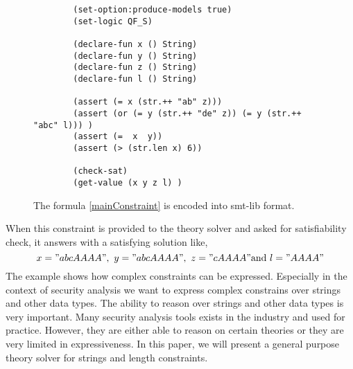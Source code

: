 	\begin{figure}[width=4cm]
		\scriptsize
		\centering
		\begin{lstlisting}
		(set-option:produce-models true)
		(set-logic QF_S)
		
		(declare-fun x () String)
		(declare-fun y () String)
		(declare-fun z () String)
		(declare-fun l () String)
		
		(assert (= x (str.++ "ab" z)))
		(assert (or (= y (str.++ "de" z)) (= y (str.++ "abc" l))) )
		(assert (=  x  y)) 
		(assert (> (str.len x) 6)) 
		
		(check-sat)
		(get-value (x y z l) )	
		\end{lstlisting}
		\caption{ \scriptsize The formula \ref{mainConstraint} is encoded into smt-lib\cite{smtlib:website} format.}
		\label{figure:main-formula-smtlib}
	\end{figure}
	When this constraint is provided to the theory solver and asked for satisfiability check, it answers with a satisfying solution like,	
	\[
	x = "abcAAAA", \ y ="abcAAAA", \ z = "cAAAA" \textnormal{and} \ l = "AAAA" 
	\]
	The example shows how complex constraints can be expressed. Especially in the context of security analysis we want to express complex constrains over strings and other data types. The ability to reason over strings and other data types is very important. Many security analysis tools exists in the industry and used for practice. However, they are either able to reason on certain theories or they are very limited in expressiveness. In this paper, we will present a general purpose theory solver for strings and length constraints.